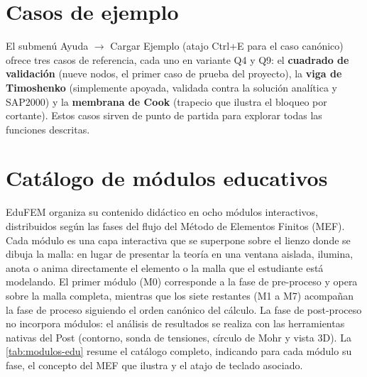 \section{Casos de ejemplo}

El submenú \textsf{Ayuda} $\rightarrow$ \textsf{Cargar Ejemplo} (atajo Ctrl+E para el caso canónico) ofrece tres casos de referencia, cada uno en variante Q4 y Q9: el \textbf{cuadrado de validación} (nueve nodos, el primer caso de prueba del proyecto), la \textbf{viga de Timoshenko} (simplemente apoyada, validada contra la solución analítica y SAP2000) y la \textbf{membrana de Cook} (trapecio que ilustra el bloqueo por cortante). Estos casos sirven de punto de partida para explorar todas las funciones descritas.


\section{Catálogo de módulos educativos}
\label{sec:catalogo-modulos-edu}

EduFEM organiza su contenido didáctico en ocho módulos interactivos, distribuidos según las fases del flujo del Método de Elementos Finitos (MEF). Cada módulo es una capa interactiva que se superpone sobre el lienzo donde se dibuja la malla: en lugar de presentar la teoría en una ventana aislada, ilumina, anota o anima directamente el elemento o la malla que el estudiante está modelando. El primer módulo (M0) corresponde a la fase de pre-proceso y opera sobre la malla completa, mientras que los siete restantes (M1 a M7) acompañan la fase de proceso siguiendo el orden canónico del cálculo. La fase de post-proceso no incorpora módulos: el análisis de resultados se realiza con las herramientas nativas del Post (contorno, sonda de tensiones, círculo de Mohr y vista 3D). La \autoref{tab:modulos-edu} resume el catálogo completo, indicando para cada módulo su fase, el concepto del MEF que ilustra y el atajo de teclado asociado.

